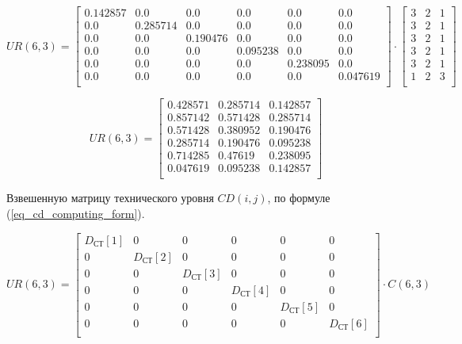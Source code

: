 $$
    UR(6,3) =
        \begin{bmatrix}
            0.142857 & 0.0      & 0.0      & 0.0      & 0.0      & 0.0      \\
            0.0      & 0.285714 & 0.0      & 0.0      & 0.0      & 0.0      \\
            0.0      & 0.0      & 0.190476 & 0.0      & 0.0      & 0.0      \\
            0.0      & 0.0      & 0.0      & 0.095238 & 0.0      & 0.0      \\
            0.0      & 0.0      & 0.0      & 0.0      & 0.238095 & 0.0      \\
            0.0      & 0.0      & 0.0      & 0.0      & 0.0      & 0.047619 \\
        \end{bmatrix}
        \cdot
        \begin{bmatrix}
            3 & 2 & 1 \\
            3 & 2 & 1 \\
            3 & 2 & 1 \\
            3 & 2 & 1 \\
            3 & 2 & 1 \\
            1 & 2 & 3 \\
        \end{bmatrix}
$$

\begin{equation}
    UR(6,3) =
        \begin{bmatrix}
            0.428571 & 0.285714 & 0.142857 \\
            0.857142 & 0.571428 & 0.285714 \\
            0.571428 & 0.380952 & 0.190476 \\
            0.285714 & 0.190476 & 0.095238 \\
            0.714285 & 0.47619  & 0.238095 \\
            0.047619 & 0.095238 & 0.142857 \\
        \end{bmatrix}
    \label{eq_cd_computing_form}
\end{equation}

Взвешенную матрицу технического уровня $CD(i, j)$, по формуле
(\ref{eq_cd_computing_form}).

\begin{equation}
    UR(6,3) =
        \begin{bmatrix}
            D_\text{СТ}[1] & 0 & 0 & 0 & 0 & 0 \\
            0 & D_\text{СТ}[2] & 0 & 0 & 0 & 0 \\
            0 & 0 & D_\text{СТ}[3] & 0 & 0 & 0 \\
            0 & 0 & 0 & D_\text{СТ}[4] & 0 & 0 \\
            0 & 0 & 0 & 0 & D_\text{СТ}[5] & 0 \\
            0 & 0 & 0 & 0 & 0 & D_\text{СТ}[6] \\
        \end{bmatrix}
        \cdot
        C(6,3)
    \label{eq_cd_computing_form}
\end{equation}

